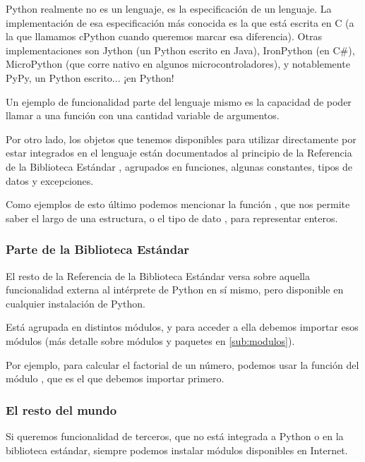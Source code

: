 \begin{info}
Python realmente no es un lenguaje, es la especificación de un lenguaje. La implementación de esa especificación más conocida es la que está escrita en C (a la que llamamos cPython cuando queremos marcar esa diferencia). Otras implementaciones son Jython (un Python escrito en Java), IronPython (en C\#), MicroPython (que corre nativo en algunos microcontroladores), y notablemente PyPy, un Python escrito... ¡en Python!
\end{info}

Un ejemplo de funcionalidad parte del lenguaje mismo es la capacidad de poder llamar a una función con una cantidad variable de argumentos.

Por otro lado, los objetos que tenemos disponibles para utilizar directamente por estar integrados en el lenguaje están documentados al principio de la Referencia de la Biblioteca Estándar \cite{stdlib}, agrupados en funciones, algunas constantes, tipos de datos y excepciones.

Como ejemplos de esto último podemos mencionar la función , que nos permite saber el largo de una estructura, o el tipo de dato , para representar enteros.


\subsubsection{Parte de la Biblioteca Estándar}\label{intro--modulos-stdlib}

El resto de la Referencia de la Biblioteca Estándar \cite{stdlib} versa sobre aquella funcionalidad externa al intérprete de Python en sí mismo, pero disponible en cualquier instalación de Python.

Está agrupada en distintos módulos, y para acceder a ella debemos importar esos módulos (más detalle sobre módulos y paquetes en \ref{sub:modulos}).

Por ejemplo, para calcular el factorial de un número, podemos usar la función  del módulo , que es el que debemos importar primero.


\subsubsection{El resto del mundo}\label{intro--modulos-resto}

Si queremos funcionalidad de terceros, que no está integrada a Python o en la biblioteca estándar, siempre podemos instalar módulos disponibles en Internet.

